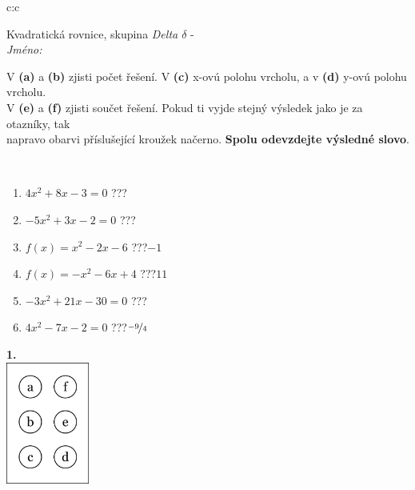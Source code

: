 \documentclass[10pt]{report}
\begin{document}
\begin{tabular}{c:c}
\begin{minipage}[c][104.5mm][t]{0.5\linewidth}
\begin{center}
\vspace{7mm}
{\huge Kvadratická rovnice, skupina \textit{Delta $\delta$} -}\\[5mm]
\textit{Jméno:}\phantom{xxxxxxxxxxxxxxxxxxxxxxxxxxxxxxxxxxxxxxxxxxxxxxxxxxxxxxxxxxxxxxxxx}\\[5mm]
\begin{minipage}{0.95\linewidth}
\begin{center}
V \textbf{(a)} a \textbf{(b)} zjisti počet řešení. V \textbf{(c)} x-ovú polohu vrcholu, a v \textbf{(d)} y-ovú polohu vrcholu.\\V \textbf{(e)} a \textbf{(f)} zjisti součet řešení. Pokud ti vyjde stejný výsledek jako je za otazníky, tak\\napravo obarvi příslušející kroužek načerno. \textbf{Spolu odevzdejte výsledné slovo}.
\end{center}
\end{minipage}
\\[1mm]
\begin{minipage}{0.79\linewidth}
\begin{center}
\begin{varwidth}{\linewidth}
\begin{enumerate}
\Large
\item $4x^2+8x-3=0$\quad \dotfill\; ???\;\dotfill {}
\item $-5x^2+3x-2=0$\quad \dotfill\; ???\;\dotfill {}
\item $f(x)=x^2-2x-6$\quad \dotfill\; ???\;\dotfill \quad $-1$
\item $f(x)=-x^2-6x+4$\quad \dotfill\; ???\;\dotfill \quad $11$
\item $-3x^2+21x-30=0$\quad \dotfill\; ???\;\dotfill {}
\item $4x^2-7x-2=0$\quad \dotfill\; ???\;\dotfill \quad $\nicefrac{-9}{4}$
\end{enumerate}
\end{varwidth}
\end{center}
\end{minipage}
\begin{minipage}{0.20\linewidth}
\begin{center}
{\Huge\bfseries 1.} \\[2mm]
\includegraphics[height=40mm]{../images/braille.png}

\end{center}
\end{minipage}
\end{center}
\end{minipage}
\end{tabular}
\end{document}
